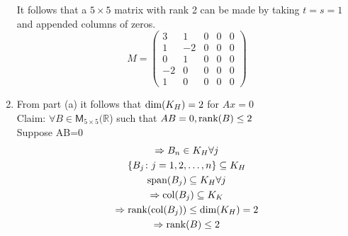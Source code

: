 \begin{enumerate}
\begin{equation}
\end{equation}
It follows that a $5\times 5$ matrix with rank 2 can be made by taking
$t=s=1$ and appended columns of zeros.
\begin{equation}
M = \begin{pmatrix}
3 & 1 & 0 & 0 & 0\\
1 & -2 & 0 & 0 & 0\\
0 & 1& 0 & 0 & 0\\
-2 & 0 & 0 & 0 &0\\
1 & 0 & 0 &0 &0 
\end{pmatrix}
\end{equation}
\newpage{}
\item From part (a) it follows that $\text{dim}({K_H}) = 2$ for $Ax=0$
\\Claim: $\forall B \in \mathsf{M}_{5\times 5}(\mathbb{R}$) such that
$AB=0, \text{rank}({B})\leq 2$
\\Suppose AB=0
\begin{gather}
\Rightarrow B_n\in K_H \forall j\\
\{B_j\colon j=1,2,\dotsc,n\}\subseteq K_H\\
\text{span}(B_j) \subseteq K_H \forall j\\
\Rightarrow \text{col}(B_j)\subseteq K_K\\
\Rightarrow \text{rank}({\text{col}(B_j)}) \leq \text{dim}({K_H})=2\\
\Rightarrow \text{rank}({B})\leq 2
\end{gather}
\end{enumerate}
